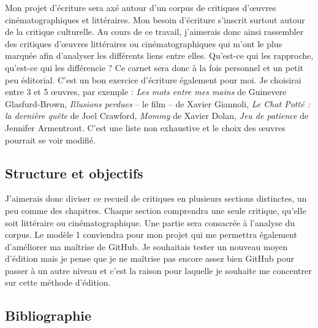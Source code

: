 \documentclass[12pt,french,letterpaper]{article}
\begin{document}
\normalsize{Mon projet d'écriture sera axé autour d'un corpus de
critiques d'œuvres cinématographiques et littéraires. Mon besoin
d'écriture s'inscrit surtout autour de la critique culturelle. Au cours
de ce travail, j'aimerais donc ainsi rassembler des critiques d'œuvres
littéraires ou cinématographiques qui m'ont le plus marquée afin
d'analyser les différents liens entre elles. Qu'est-ce qui les
rapproche, qu'est-ce qui les différencie ? Ce carnet sera donc à la fois
personnel et un petit peu éditorial. C'est un bon exercice d'écriture
également pour moi. Je choisirai entre 3 et 5 œuvres, par exemple :
\emph{Les mots entre mes mains} de Guinevere Glasfurd-Brown,
\emph{Illusions perdues} -- le film -- de Xavier Giannoli, \emph{Le Chat
Potté : la dernière quête} de Joel Crawford, \emph{Mommy} de Xavier
Dolan, \emph{Jeu de patience} de Jennifer Armentrout. C'est une liste
non exhaustive et le choix des œuvres pourrait se voir modifié.

\hypertarget{structure-et-objectifs}{%
\subsection{Structure et objectifs}\label{structure-et-objectifs}}

J'aimerais donc diviser ce recueil de critiques en plusieurs sections
distinctes, un peu comme des chapitres. Chaque section comprendra une
seule critique, qu'elle soit littéraire ou cinématographique. Une partie
sera consacrée à l'analyse du corpus. Le modèle 1 conviendra pour mon
projet qui me permettra également d'améliorer ma maîtrise de GitHub. Je
souhaitais tester un nouveau moyen d'édition mais je pense que je ne
maîtrise pas encore assez bien GitHub pour passer à un autre niveau et
c'est la raison pour laquelle je souhaite me concentrer sur cette
méthode d'édition.

\newpage

\hypertarget{bibliographie}{%
\subsection{Bibliographie}\label{bibliographie}}}
\end{document}
